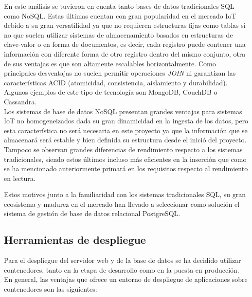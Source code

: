 \documentclass[../proyecto.tex]{subfiles}
\begin{document}
En este análisis se tuvieron en cuenta tanto bases de datos tradicionales SQL como NoSQL. Estas últimas cuentan con gran popularidad en el mercado IoT debido a su gran versatilidad ya que no requieren estructuras fijas como tablas si no que suelen utilizar sistemas de almacenamiento basados en estructuras de clave-valor o en forma de documentos, es decir, cada registro puede contener una información con diferente forma de otro registro dentro del mismo conjunto, otra de sus ventajas es que son altamente escalables horizontalmente. Como principales desventajas no suelen permitir operaciones \textit{JOIN} ni garantizan las características ACID (atomicidad, consistencia, aislamiento y durabilidad). Algunos ejemplos de este tipo de tecnología son MongoDB, CouchDB o Cassandra.\\

Los sistemas de base de datos NoSQL presentan grandes ventajas para sistemas IoT no homogeneizados dada su gran dinamicidad en la ingesta de los datos, pero esta característica no será necesaria en este proyecto ya que la información que se almacenará será estable y bien definida su estructura desde el inició del proyecto. Tampoco se observan grandes diferencias de rendimiento respecto a los sistemas tradicionales, siendo estos últimos incluso más eficientes en la inserción \cite{ASIMINIDIS2018} \cite{RAUTMARE2016} que como se ha mencionado anteriormente primará en los requisitos respecto al rendimiento en lectura.

Estos motivos junto a la familiaridad con los sistemas tradicionales SQL, su gran ecosistema y madurez en el mercado han llevado a seleccionar como solución el sistema de gestión de base de datos relacional PostgreSQL.

\subsection{Herramientas de despliegue}

Para el despliegue del servidor web y de la base de datos se ha decidido utilizar contenedores, tanto en la etapa de desarrollo como en la puesta en producción. En general, las ventajas que ofrece un entorno de despliegue de aplicaciones sobre contenedores son las siguientes:\\
\end{document}
